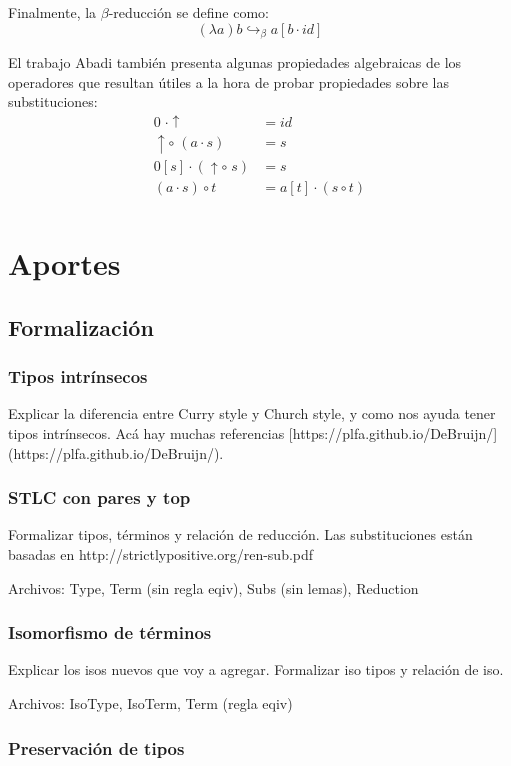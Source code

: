\documentclass[]{report}
\begin{document}
	Finalmente, la $\beta$-reducción se define como:
	\[ (\lambda a)b \hookrightarrow_{\beta} a[b \cdot id] \]
	
	El trabajo Abadi también presenta algunas propiedades algebraicas de los operadores que resultan útiles a la hora de probar propiedades sobre las substituciones:
	\begin{align*}
		0 \; \cdot \uparrow &= id \\
		\uparrow \circ\; (a \cdot s) &= s \\
		0[s] \cdot (\uparrow \circ\; s) &= s \\
		(a \cdot s) \circ t &= a[t] \cdot (s \circ t) \\
	\end{align*}
	
	
	\chapter{Aportes}
	\section{Formalización}
	\subsection{Tipos intrínsecos}
	Explicar la diferencia entre Curry style y Church style, y como nos ayuda tener tipos intrínsecos. Acá hay muchas referencias
	[https://plfa.github.io/DeBruijn/] (https://plfa.github.io/DeBruijn/).
	\subsection{STLC con pares y top}
	Formalizar tipos, términos y relación de reducción.
	Las substituciones están basadas en http://strictlypositive.org/ren-sub.pdf
	
	Archivos: Type, Term (sin regla eqiv), Subs (sin lemas), Reduction
	
	\subsection{Isomorfismo de términos}
	Explicar los isos nuevos que voy a agregar. Formalizar iso tipos y relación de iso.
	
	Archivos: IsoType, IsoTerm, Term (regla eqiv)
	
	\subsection{Preservación de tipos}
	
\end{document}
